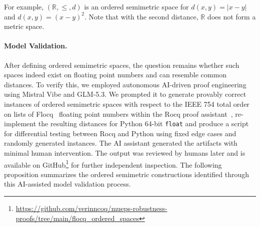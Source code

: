 For example, $(\mathbb{R},\le, d)$ is an ordered semimetric space for $d(x,y) = |x - y|$ and $d(x,y) = (x - y)^2$. Note that with the second distance, $\mathbb{R}$ does not form a metric space.

\paragraph{Model Validation.} After defining ordered semimetric spaces, the question remains whether such spaces indeed exist on floating point numbers and can resemble common distances. To verify this, we employed autonomous AI-driven proof engineering using Mistral Vibe and GLM-5.3. We prompted it to generate provably correct instances of ordered semimetric spaces with respect to the IEEE 754 total order on lists of Flocq~\cite{boldo2011flocq} floating point numbers within the Rocq proof assistant~\cite{rocq}, re-implement the resulting distances for Python  64-bit \texttt{float} and produce a script for differential testing between Rocq and Python using fixed edge cases and randomly generated instances. The AI assistant generated the artifacts with minimal human intervention. The output was reviewed by humans later and is available on GitHub\footnote{\url{https://github.com/verinncoq/mueps-robustness-proofs/tree/main/flocq_ordered_spaces}} for further independent inspection. The following proposition summarizes the ordered semimetric constructions identified through this AI-assisted model validation process.

